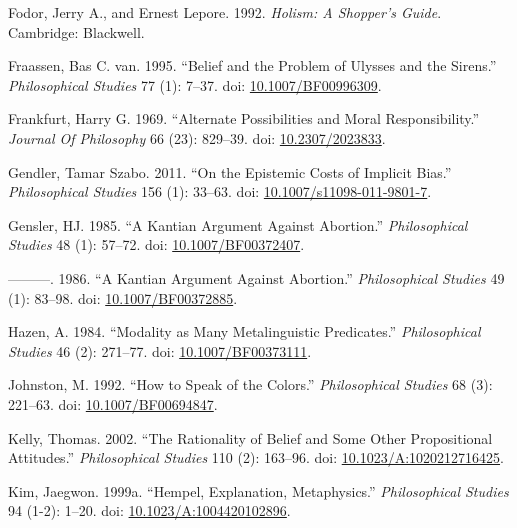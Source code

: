 \documentclass[
  10pt,
  letterpaper,
  DIV=11,
  numbers=noendperiod,
  twoside]{scrartcl}
\newlength{\cslhangindent}
\newenvironment{CSLReferences}[2] %
 {\begin{list}{}{%
  \setlength{\itemindent}{0pt}
  \setlength{\leftmargin}{0pt}
  \setlength{\parsep}{0pt}
  \ifodd #1
   \setlength{\leftmargin}{\cslhangindent}
   \setlength{\itemindent}{-1\cslhangindent}
  \fi
  \setlength{\itemsep}{#2\baselineskip}}}
 {\end{list}}
\begin{document}
\begin{CSLReferences}{1}{0}
Fodor, Jerry A., and Ernest Lepore. 1992. \emph{Holism: A Shopper's
Guide}. Cambridge: Blackwell.

Fraassen, Bas C. van. 1995. {``Belief and the Problem of Ulysses and the
Sirens.''} \emph{Philosophical Studies} 77 (1): 7--37. doi:
\href{https://doi.org/10.1007/BF00996309}{10.1007/BF00996309}.

Frankfurt, Harry G. 1969. {``Alternate Possibilities and Moral
Responsibility.''} \emph{Journal Of Philosophy} 66 (23): 829--39. doi:
\href{https://doi.org/10.2307/2023833}{10.2307/2023833}.

Gendler, Tamar Szabo. 2011. {``On the Epistemic Costs of Implicit
Bias.''} \emph{Philosophical Studies} 156 (1): 33--63. doi:
\href{https://doi.org/10.1007/s11098-011-9801-7}{10.1007/s11098-011-9801-7}.

Gensler, HJ. 1985. {``A Kantian Argument Against Abortion.''}
\emph{Philosophical Studies} 48 (1): 57--72. doi:
\href{https://doi.org/10.1007/BF00372407}{10.1007/BF00372407}.

---------. 1986. {``A Kantian Argument Against Abortion.''}
\emph{Philosophical Studies} 49 (1): 83--98. doi:
\href{https://doi.org/10.1007/BF00372885}{10.1007/BF00372885}.

Hazen, A. 1984. {``Modality as Many Metalinguistic Predicates.''}
\emph{Philosophical Studies} 46 (2): 271--77. doi:
\href{https://doi.org/10.1007/BF00373111}{10.1007/BF00373111}.

Johnston, M. 1992. {``How to Speak of the Colors.''} \emph{Philosophical
Studies} 68 (3): 221--63. doi:
\href{https://doi.org/10.1007/BF00694847}{10.1007/BF00694847}.

Kelly, Thomas. 2002. {``The Rationality of Belief and Some Other
Propositional Attitudes.''} \emph{Philosophical Studies} 110 (2):
163--96. doi:
\href{https://doi.org/10.1023/A:1020212716425}{10.1023/A:1020212716425}.

Kim, Jaegwon. 1999a. {``Hempel, Explanation, Metaphysics.''}
\emph{Philosophical Studies} 94 (1-2): 1--20. doi:
\href{https://doi.org/10.1023/A:1004420102896}{10.1023/A:1004420102896}.


\end{CSLReferences}
\end{document}
